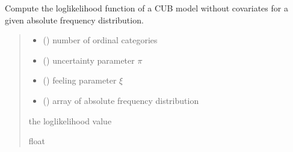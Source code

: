 \documentclass[letterpaper,10pt,english]{sphinxmanual}
\begin{document}
\begin{fulllineitems}
\label{\detokenize{cubmods:cubmods.cub.loglik}}
\pysigstartsignatures
{}
\pysigstopsignatures
\sphinxAtStartPar
Compute the log\sphinxhyphen{}likelihood function of a CUB model without 
covariates for a given absolute frequency distribution.
\begin{quote}\begin{description}
\begin{itemize}
\item {} 
\sphinxAtStartPar
{} () \textendash{} number of ordinal categories

\item {} 
\sphinxAtStartPar
{} () \textendash{} uncertainty parameter \(\pi\)

\item {} 
\sphinxAtStartPar
{} () \textendash{} feeling parameter \(\xi\)

\item {} 
\sphinxAtStartPar
{} () \textendash{} array of absolute frequency distribution

\end{itemize}

\sphinxAtStartPar
the log\sphinxhyphen{}likelihood value

\sphinxAtStartPar
float

\end{description}\end{quote}

\end{fulllineitems}

\end{document}
